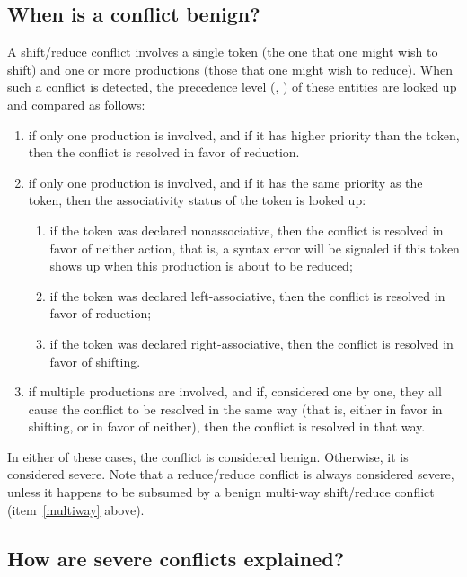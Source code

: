 \documentclass[onecolumn,11pt,nocopyrightspace,preprint]{sigplanconf}
\begin{document}
\subsection{When is a conflict benign?}
\label{sec:conflicts:benign}

A shift/reduce conflict involves a single token (the one that one might wish
to shift) and one or more productions (those that one might wish to
reduce). When such a conflict is detected, the precedence level
(, ) of these entities are looked up and
compared as follows:
\begin{enumerate}
\item if only one production is involved, and if it has higher priority
      than the token, then the conflict is resolved in favor of reduction.
\item if only one production is involved, and if it has the same priority
      as the token, then the associativity status of the token is looked up:
      \begin{enumerate}
      \item if the token was declared nonassociative, then the conflict is
            resolved in favor of neither action, that is, a syntax error
	    will be signaled if this token shows up when this production
	    is about to be reduced;
      \item if the token was declared left-associative, then the conflict
            is resolved in favor of reduction;
      \item if the token was declared right-associative, then the conflict
            is resolved in favor of shifting.
      \end{enumerate}
\item \label{multiway}
      if multiple productions are involved, and if, considered one by one,
      they all cause the conflict to be resolved in the same way (that is,
      either in favor in shifting, or in favor of neither), then the conflict
      is resolved in that way.
\end{enumerate}
In either of these cases, the conflict is considered benign. Otherwise, it is
considered severe. Note that a reduce/reduce conflict is always considered
severe, unless it happens to be subsumed by a benign multi-way shift/reduce
conflict (item~\ref{multiway} above).

\subsection{How are severe conflicts explained?}
\end{document}
